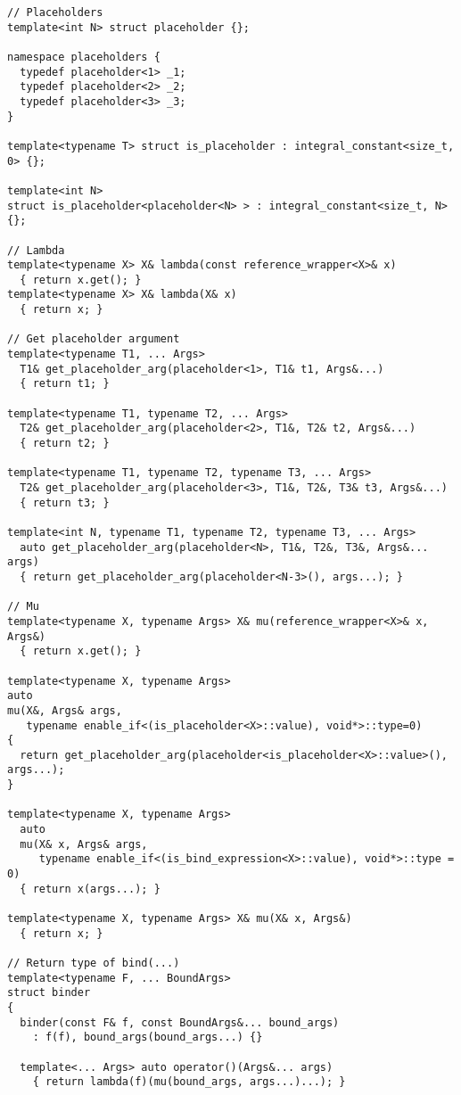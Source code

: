 \documentclass{article}
\begin{document}
\small
\begin{verbatim}
// Placeholders
template<int N> struct placeholder {};

namespace placeholders {
  typedef placeholder<1> _1;
  typedef placeholder<2> _2;
  typedef placeholder<3> _3;
}

template<typename T> struct is_placeholder : integral_constant<size_t, 0> {};

template<int N> 
struct is_placeholder<placeholder<N> > : integral_constant<size_t, N> {};

// Lambda
template<typename X> X& lambda(const reference_wrapper<X>& x)
  { return x.get(); }
template<typename X> X& lambda(X& x)
  { return x; }

// Get placeholder argument
template<typename T1, ... Args>
  T1& get_placeholder_arg(placeholder<1>, T1& t1, Args&...)
  { return t1; }

template<typename T1, typename T2, ... Args>
  T2& get_placeholder_arg(placeholder<2>, T1&, T2& t2, Args&...)
  { return t2; }

template<typename T1, typename T2, typename T3, ... Args>
  T2& get_placeholder_arg(placeholder<3>, T1&, T2&, T3& t3, Args&...)
  { return t3; }

template<int N, typename T1, typename T2, typename T3, ... Args>
  auto get_placeholder_arg(placeholder<N>, T1&, T2&, T3&, Args&... args)
  { return get_placeholder_arg(placeholder<N-3>(), args...); }

// Mu
template<typename X, typename Args> X& mu(reference_wrapper<X>& x, Args&)
  { return x.get(); }

template<typename X, typename Args>
auto 
mu(X&, Args& args, 
   typename enable_if<(is_placeholder<X>::value), void*>::type=0)
{ 
  return get_placeholder_arg(placeholder<is_placeholder<X>::value>(), args...);
}

template<typename X, typename Args>
  auto 
  mu(X& x, Args& args, 
     typename enable_if<(is_bind_expression<X>::value), void*>::type = 0)
  { return x(args...); }

template<typename X, typename Args> X& mu(X& x, Args&)
  { return x; }

// Return type of bind(...)
template<typename F, ... BoundArgs>
struct binder
{
  binder(const F& f, const BoundArgs&... bound_args)
    : f(f), bound_args(bound_args...) {}

  template<... Args> auto operator()(Args&... args)
    { return lambda(f)(mu(bound_args, args...)...); }


\end{verbatim}
\end{document}
